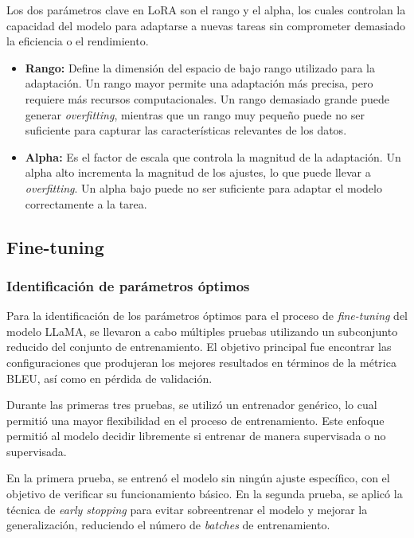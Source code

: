 Los dos parámetros clave en LoRA son el rango y el alpha, los cuales controlan la capacidad del modelo para adaptarse a nuevas tareas sin comprometer demasiado la eficiencia o el rendimiento.

\begin{itemize}
    \item \textbf{Rango:} Define la dimensión del espacio de bajo rango utilizado para la adaptación. Un rango mayor permite una adaptación más precisa, pero requiere más recursos computacionales. Un rango demasiado grande puede generar \textit{overfitting}, mientras que un rango muy pequeño puede no ser suficiente para capturar las características relevantes de los datos.
    \item \textbf{Alpha:} Es el factor de escala que controla la magnitud de la adaptación. Un alpha alto incrementa la magnitud de los ajustes, lo que puede llevar a \textit{overfitting}. Un alpha bajo puede no ser suficiente para adaptar el modelo correctamente a la tarea.
\end{itemize}





\subsection{Fine-tuning}

\subsubsection{Identificación de parámetros óptimos}

Para la identificación de los parámetros óptimos para el proceso de \textit{fine-tuning} del modelo LLaMA, se llevaron a cabo múltiples pruebas utilizando un subconjunto reducido del conjunto de entrenamiento. El objetivo principal fue encontrar las configuraciones que produjeran los mejores resultados en términos de la métrica BLEU, así como en pérdida de validación.

Durante las primeras tres pruebas, se utilizó un entrenador genérico, lo cual permitió una mayor flexibilidad en el proceso de entrenamiento. Este enfoque permitió al modelo decidir libremente si entrenar de manera supervisada o no supervisada.

En la primera prueba, se entrenó el modelo sin ningún ajuste específico, con el objetivo de verificar su funcionamiento básico. En la segunda prueba, se aplicó la técnica de \textit{early stopping} para evitar sobreentrenar el modelo y mejorar la generalización, reduciendo el número de \textit{batches} de entrenamiento. 

